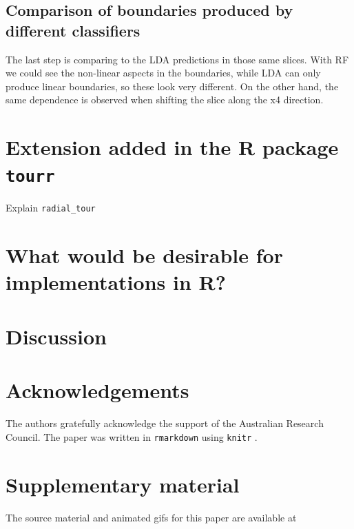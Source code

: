 \documentclass[]{interact}
\theoremstyle{plain}%
\theoremstyle{definition}
\theoremstyle{remark}
\begin{document}
\hypertarget{comparison-of-boundaries-produced-by-different-classifiers}{%
\subsection{Comparison of boundaries produced by different
classifiers}\label{comparison-of-boundaries-produced-by-different-classifiers}}

The last step is comparing to the LDA predictions in those same slices.
With RF we could see the non-linear aspects in the boundaries, while LDA
can only produce linear boundaries, so these look very different. On the
other hand, the same dependence is observed when shifting the slice
along the x4 direction.

\hypertarget{extension-added-in-the-r-package-tourr}{%
\section{\texorpdfstring{Extension added in the R package
\texttt{tourr}}{Extension added in the R package tourr}}\label{extension-added-in-the-r-package-tourr}}

Explain \texttt{radial\_tour}

\hypertarget{what-would-be-desirable-for-implementations-in-r}{%
\section{What would be desirable for implementations in
R?}\label{what-would-be-desirable-for-implementations-in-r}}

\hypertarget{sec:discussion}{%
\section{Discussion}\label{sec:discussion}}

\hypertarget{acknowledgements}{%
\section*{Acknowledgements}\label{acknowledgements}}

The authors gratefully acknowledge the support of the Australian
Research Council. The paper was written in \texttt{rmarkdown}
\citep{rmarkdown} using \texttt{knitr} \citep{knitr}.

\hypertarget{supplementary-material}{%
\section*{Supplementary material}\label{supplementary-material}}

The source material and animated gifs for this paper are available at



\end{document}

